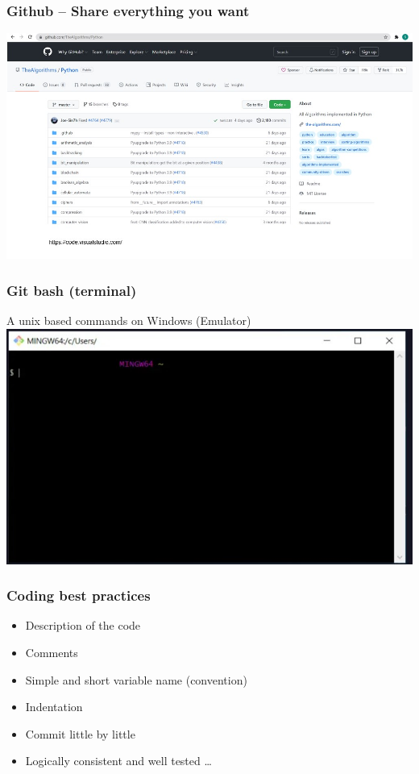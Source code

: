 \documentclass{beamer}
\begin{document}
\begin{frame}
    \frametitle{Github – Share everything you want}
    \centering
    \includegraphics[scale = 0.5]{figures/github.jpg}
\end{frame}

\begin{frame}
    \frametitle{Git bash (terminal)}
    A unix based commands on Windows (Emulator)
    \centering
    \includegraphics[scale = 0.5]{figures/git_bash.jpg}
\end{frame}

\begin{frame}
    \frametitle{Coding best practices}
    \begin{itemize}
        \item Description of the code
        \item Comments
        \item Simple and short variable name (convention)
        \item Indentation
        \item Commit little by little
        \item Logically consistent and well tested … 
    \end{itemize}
\end{frame}
\end{document}
